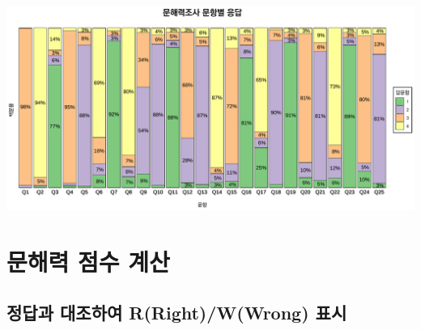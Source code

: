 \documentclass[
]{book}
\begin{document}
\includegraphics{Quiz_report_2025_files/figure-latex/unnamed-chunk-127-1.pdf}

\section{문해력 점수 계산}\label{uxbb38uxd574uxb825-uxc810uxc218-uxacc4uxc0b0}

\subsection{정답과 대조하여 R(Right)/W(Wrong) 표시}\label{uxc815uxb2f5uxacfc-uxb300uxc870uxd558uxc5ec-rrightwwrong-uxd45cuxc2dc}
\end{document}
